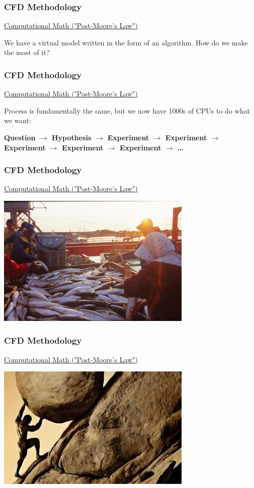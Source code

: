 \documentclass[12pt]{beamer}
\begin{document}
\begin{frame}
    \frametitle{CFD Methodology}
    \underline{Computational Math ("Post-Moore's Law")}

    We have a virtual model written in the form of an algorithm. How do we make the most of it?
\end{frame}
\begin{frame}
    \frametitle{CFD Methodology}
    \underline{Computational Math ("Post-Moore's Law")}

    Process is fundamentally the same, but we now have 1000s of CPUs to do 
    what we want:

    \textbf{Question $\rightarrow$ Hypothesis $\rightarrow$ Experiment $\rightarrow$ Experiment $\rightarrow$ Experiment $\rightarrow$ Experiment $\rightarrow$ Experiment $\rightarrow$ \dots}
\end{frame}
\begin{frame}
    \frametitle{CFD Methodology}
    \underline{Computational Math ("Post-Moore's Law")}

    \includegraphics[width=0.7\textwidth]{img/1-fisher.jpg}
\end{frame}
\begin{frame}
    \frametitle{CFD Methodology}
    \underline{Computational Math ("Post-Moore's Law")}

    \includegraphics[width=0.7\textwidth]{img/2-sisyphus.jpg}
\end{frame}
\end{document}
